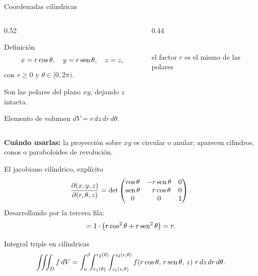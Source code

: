 \documentclass[11pt,aspectratio=169]{beamer}
\begin{document}
\begin{frame}{Coordenadas cilíndricas}
  \begin{columns}
    \begin{column}{0.52\textwidth}
      \begin{block}{Definición}
        \[
          x=r\cos\theta,\quad y=r\operatorname{sen}\theta,\quad z=z,
        \]
        con $r\ge0$ y $\theta\in[0,2\pi)$.
      \end{block}
      \pause
      \vspace{4pt}
      Son las polares del plano $xy$, dejando $z$ intacta.
      \pause
      \begin{block}{Elemento de volumen}
        \centering $dV = r\,dz\,dr\,d\theta$.
      \end{block}
    \end{column}
    \begin{column}{0.44\textwidth}
      \centering
      \\[2pt]
      {\footnotesize\color{gray60} el factor $r$ es el mismo de las polares}
    \end{column}
  \end{columns}
  \pause
  \begin{center}\small\color{gray60}
  \textbf{Cuándo usarlas:} la proyección sobre $xy$ es circular o anular; aparecen cilindros, conos o paraboloides de revolución.
  \end{center}
\end{frame}

\begin{frame}{El jacobiano cilíndrico, explícito}
  \[
    \frac{\partial(x,y,z)}{\partial(r,\theta,z)}
    = \det\begin{pmatrix}
        \cos\theta & -r\operatorname{sen}\theta & 0\\
        \operatorname{sen}\theta & \ \ r\cos\theta & 0\\
        0 & 0 & 1
      \end{pmatrix}.
  \]
  \pause
  Desarrollando por la tercera fila:
  \[
    = 1\cdot\bigl(r\cos^2\theta + r\operatorname{sen}^2\theta\bigr) = r.
  \]
  \pause
  \begin{block}{Integral triple en cilíndricas}
    \[
      \iiint_D f\,dV
      = \int_\alpha^\beta\!\!\int_{r_1(\theta)}^{r_2(\theta)}\!\!\int_{z_1(r,\theta)}^{z_2(r,\theta)}
        f(r\cos\theta,\,r\sen\theta,\,z)\ r\,dz\,dr\,d\theta.
    \]
  \end{block}
\end{frame}
\end{document}
